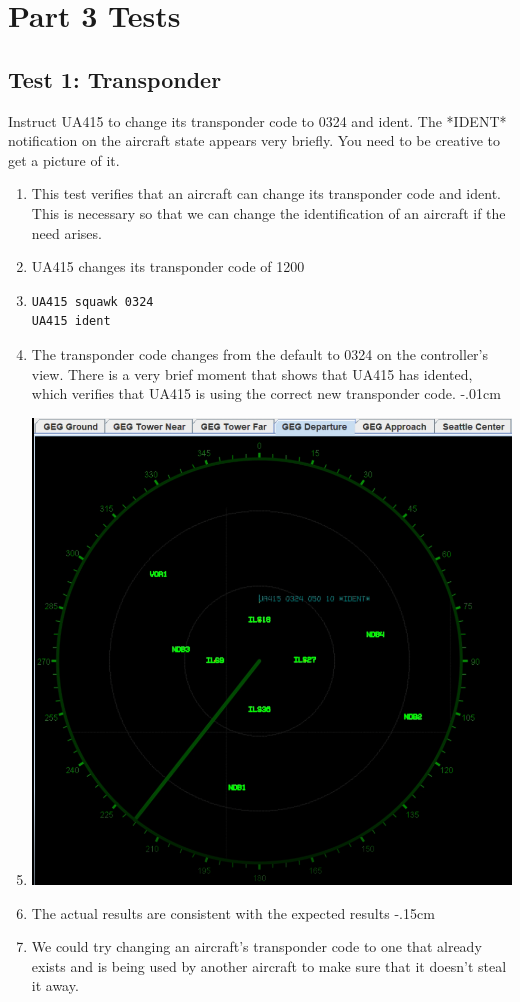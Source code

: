 \documentclass[letterpaper, 12pt]{article}
\begin{document}
\section{Part 3 Tests}
\subsection{Test 1: Transponder}
Instruct UA415 to change its transponder code to 0324 and ident. 
The *IDENT* notification on the aircraft state appears very briefly. You need to be creative to get a picture of it.
\begin{enumerate}\itemsep-.15cm
\item This test verifies that an aircraft can change its transponder code and ident. This is necessary so that we can change the identification of an aircraft if the need arises.
\item UA415 changes its transponder code of 1200
\item \begin{verbatim}UA415 squawk 0324
UA415 ident
\end{verbatim}
\item The transponder code changes from the default to 0324 on the controller's view. There is a very brief moment that shows that UA415 has idented, which verifies that UA415 is using the correct new transponder code.
\itemsep-.01cm
\item \includegraphics[scale=.23,valign=t,center]{test1.png}
\item The actual results are consistent with the expected results
\itemsep-.15cm
\item We could try changing an aircraft's transponder code to one that already exists and is being used by another aircraft to make sure that it doesn’t steal it away.
\end{enumerate}
\end{document}

